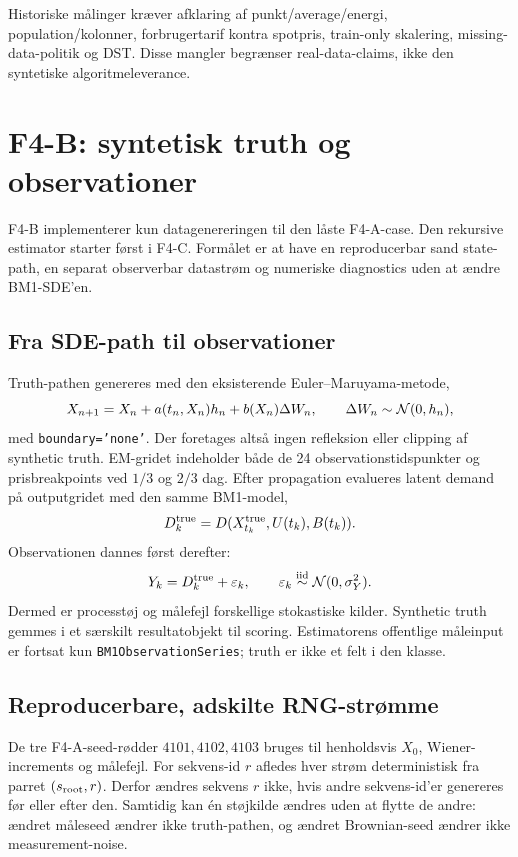Historiske målinger kræver afklaring af punkt/average/energi, population/kolonner,
forbrugertarif kontra spotpris, train-only skalering, missing-data-politik og DST.
Disse mangler begrænser real-data-claims, ikke den syntetiske algoritmeleverance.

\section{F4-B: syntetisk truth og observationer}
\label{sec:f4b}
F4-B implementerer kun datagenereringen til den låste F4-A-case. Den rekursive
estimator starter først i F4-C. Formålet er at have en reproducerbar sand state-path,
en separat observerbar datastrøm og numeriske diagnostics uden at ændre BM1-SDE'en.

\subsection{Fra SDE-path til observationer}
Truth-pathen genereres med den eksisterende Euler--Maruyama-metode,
\begin{equation}
 X_{n+1}=X_n+a(t_n,X_n)h_n+b(X_n)\Delta W_n,\qquad
 \Delta W_n\sim\mathcal N(0,h_n),
 \label{eq:f4b_em}
\end{equation}
med \texttt{boundary='none'}. Der foretages altså ingen refleksion eller clipping af
synthetic truth. EM-gridet indeholder både de 24 observationstidspunkter og
prisbreakpoints ved \(1/3\) og \(2/3\) dag. Efter propagation evalueres latent demand
på outputgridet med den samme BM1-model,
\begin{equation}
 D_k^{\rm true}=D(X_{t_k}^{\rm true},U(t_k),B(t_k)).
 \label{eq:f4b_demand}
\end{equation}
Observationen dannes først derefter:
\begin{equation}
 Y_k=D_k^{\rm true}+\varepsilon_k,\qquad
 \varepsilon_k\overset{\rm iid}{\sim}\mathcal N(0,\sigma_Y^2).
 \label{eq:f4b_observation}
\end{equation}
Dermed er processtøj og målefejl forskellige stokastiske kilder. Synthetic truth
gemmes i et særskilt resultatobjekt til scoring. Estimatorens offentlige måleinput er
fortsat kun \texttt{BM1ObservationSeries}; truth er ikke et felt i den klasse.

\subsection{Reproducerbare, adskilte RNG-strømme}
De tre F4-A-seed-rødder \(4101,4102,4103\) bruges til henholdsvis \(X_0\),
Wiener-increments og målefejl. For sekvens-id \(r\) afledes hver strøm deterministisk
fra parret \((s_{\rm root},r)\). Derfor ændres sekvens \(r\) ikke, hvis andre sekvens-id'er
genereres før eller efter den. Samtidig kan én støjkilde ændres uden at flytte de andre:
ændret måleseed ændrer ikke truth-pathen, og ændret Brownian-seed ændrer ikke
measurement-noise.

